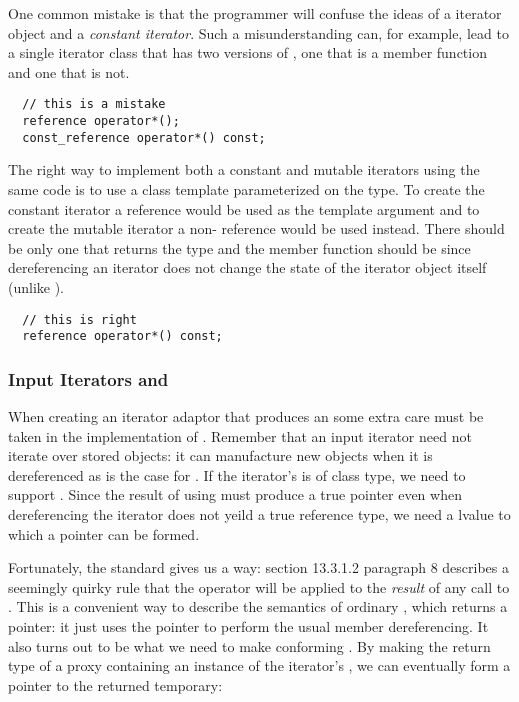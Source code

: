 \documentclass{netobjectdays}
\begin{document}
One common mistake is that the programmer will confuse the ideas of
a  iterator object and a \emph{constant iterator}. Such a
misunderstanding can, for example, lead to a single iterator class that has
two versions of , one that is a  member function
and one that is not.
 
{\footnotesize
\begin{verbatim}
  // this is a mistake
  reference operator*();
  const_reference operator*() const;
\end{verbatim}
}

The right way to implement both a constant and mutable iterators using
the same code is to use a class template parameterized on the
 type. To create the constant iterator a 
reference would be used as the template argument and to create the
mutable iterator a non- reference would be used instead. 
There should be only one  that returns the
 type and the member function should be  since
dereferencing an iterator does not change the state of the iterator
object itself (unlike ).

{\footnotesize
\begin{verbatim}
  // this is right
  reference operator*() const;
\end{verbatim}
}


\subsubsection{Input Iterators and }

When creating an iterator adaptor that produces an
 some extra care must be
taken in the implementation of . Remember that an
input iterator need not iterate over stored objects: it
can manufacture new objects when it is dereferenced as is the case for
. If the iterator's  is
of class type, we need to support . Since the result
of using  must produce a true pointer even when
dereferencing the iterator does not yeild a true reference type, we
need a  lvalue to which a pointer can be formed.

Fortunately, the standard gives us a way: section 13.3.1.2 paragraph 8
describes a seemingly quirky rule that the \code{->} operator will be
applied to the \emph{result} of any call to . This is
a convenient way to describe the semantics of ordinary
, which returns a pointer: it just uses the pointer
to perform the usual member dereferencing. It also turns out to be
what we need to make conforming . By making
the return type of  a proxy containing an instance of
the iterator's , we can eventually form a
 pointer to the returned temporary:
\end{document}
